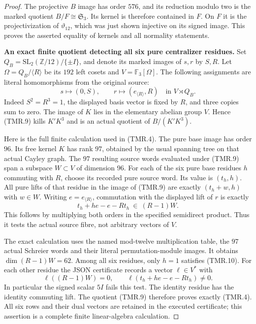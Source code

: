 \begin{proof}
The projective $B$ image has order $576$, and
its reduction modulo two is the marked quotient
$B/F\cong\mathfrak S_3$.
Its kernel is therefore contained in $F$.
On $F$ it is the projectivization of
$\vartheta_{12}$, which was just shown injective
on its signed image.  This proves the asserted
equality of kernels and all normality statements.

\par\medskip\noindent\textbf{An exact finite quotient detecting all six pure centralizer residues.}\quad
Set $Q_B=\mathrm{SL}_2(\mathbb Z/12)/\{\pm I\}$,
and denote its marked images of $s,r$ by $S,R$.
Let $\Omega=Q_B/\langle R\rangle$ be its $192$
left cosets and $V=\mathbb F_3[\Omega]$.
The following assignments are literal homomorphisms
from the original source:
\[
 s\longmapsto(0,S),\qquad
 r\longmapsto(e_{\langle R\rangle},R)
                  \quad\text{in }V\rtimes Q_B .
                                                               \tag{TMR.9}
\]
Indeed $S^2=R^3=1$, the displayed basis vector
is fixed by $R$, and three copies sum to zero.
The image of $K$ lies in the elementary abelian
group $V$.  Hence (TMR.9) kills $K'K^3$ and
is an actual quotient of $B/(K'K^3)$.

Here is the full finite calculation used in (TMR.4).
The pure base image has order $96$.
Its free kernel $K$ has rank $97$, obtained by
the usual spanning tree on that actual Cayley
graph.  The $97$ resulting source words evaluated
under (TMR.9) span a subspace $W\subset V$ of
dimension $96$.
For each of the six pure base residues $h$
commuting with $R$, choose its recorded pure
source word.  Its value is $(t_h,h)$.
All pure lifts of that residue in the image of
(TMR.9) are exactly $(t_h+w,h)$ with $w\in W$.
Writing $e=e_{\langle R\rangle}$, commutation
with the displayed lift of $r$ is exactly
\[
       t_h+h e-e-Rt_h\ \in\ (R-1)W.
                                                               \tag{TMR.10}
\]
This follows by multiplying both orders in the
specified semidirect product.  Thus it tests the
actual source fibre, not arbitrary vectors of $V$.

The exact calculation
uses the named mod-twelve multiplication table,
the $97$ actual Schreier words and their literal
permutation-module images.
It obtains $\dim(R-1)W=62$.
Among all six residues, only $h=1$ satisfies
(TMR.10).  For each other residue the JSON
certificate records a vector $\ell\in V^*$ with
\[
     \ell((R-1)W)=0,
     \qquad\ell(t_h+h e-e-Rt_h)\ne0.
                                                               \tag{TMR.11}
\]
In particular the signed scalar $5I$ fails this
test.  The identity residue has the identity
commuting lift.  The quotient (TMR.9) therefore
proves exactly (TMR.4).
All six rows and their dual vectors are retained
in the executed certificate; this assertion is
a complete finite linear-algebra calculation.


\end{proof}
